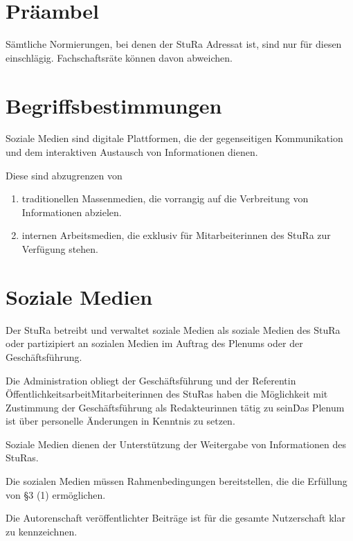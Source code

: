 \setcounter{section}{0}
\begin{multicols}{2}

\section{Präambel}
\Abs \Satz Sämtliche Normierungen, bei denen der StuRa Adressat ist, sind nur für diesen einschlägig. \Satz Fachschaftsräte können davon abweichen.

\section{Begriffsbestimmungen}
\Abs \Satz Soziale Medien sind digitale Plattformen, die der gegenseitigen Kommunikation und dem interaktiven Austausch von Informationen dienen.

\Abs \Satz Diese sind abzugrenzen von
\begin{enumerate}
\item traditionellen Massenmedien, die vorrangig auf die Verbreitung von Informationen abzielen. 
\item internen Arbeitsmedien, die exklusiv für Mitarbeiterinnen des StuRa zur Verfügung stehen.
\end{enumerate}

\section {Soziale Medien}
\Abs \Satz Der StuRa betreibt und verwaltet soziale Medien als soziale Medien des StuRa oder partizipiert an sozialen Medien im Auftrag des Plenums oder der Geschäftsführung.

\Abs \Satz Die Administration obliegt der Geschäftsführung und der Referentin Öffentlichkeitsarbeit\. Mitarbeiterinnen des StuRas haben die Möglichkeit mit Zustimmung der Geschäftsführung als Redakteurinnen tätig zu sein\. Das Plenum ist über personelle Änderungen in Kenntnis zu setzen.

\Abs \Satz Soziale Medien dienen der Unterstützung der Weitergabe von Informationen des StuRas.

\Abs \Satz Die sozialen Medien müssen Rahmenbedingungen bereitstellen, die die Erfüllung von §3 (1) ermöglichen.

\Abs \Satz Die Autorenschaft veröffentlichter Beiträge ist für die gesamte Nutzerschaft klar zu kennzeichnen.


\end{multicols}

